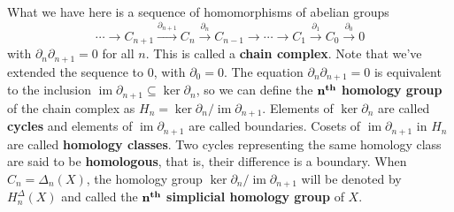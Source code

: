 What we have here is a sequence of homomorphisms of abelian groups \[
    \cdots \to C_{n+1}\overset{\partial _{n+1}}{\longrightarrow} C_n \overset{\partial _n }{\longrightarrow} C_{n-1}\to \cdots \to C_1\overset{\partial_1}{\longrightarrow}C_0\overset{\partial_0}{\longrightarrow}0 
\] with $\partial _n \partial _{n+1}=0$ for all $n$. This is called a \textbf{chain complex}. Note that  we've extended the sequence to $0$, with $\partial_0=0 $. The equation $\partial _n \partial _{n+1}=0$ is equivalent to the inclusion $\operatorname{im}\partial _{n+1}\subseteq \ker \partial _n $, so we can define the $\mathbf{n}^{\text{\textbf{th}}}$ \textbf{homology group} of the chain complex as $H_n =\ker \partial_n  / \operatorname{im} \partial _{n+1}$. Elements of $\ker \partial _n $ are called \textbf{cycles} and elements of $\operatorname{im}\partial _{n+1}$ are called boundaries. Cosets of $\operatorname{im}\partial _{n+1}$ in $H_n $ are called \textbf{homology classes}. Two cycles representing the same homology class are said to be \textbf{homologous}, that is, their difference is a boundary. When $C_n=\Delta _n (X)$, the homology group $\ker \partial _n / \operatorname{im}\partial _{n+1} $ will be denoted by $H_n ^{\Delta }(X)$ and called the $\mathbf{n}^{\text{\textbf{th}}}$ \textbf{simplicial homology group} of $X$.

